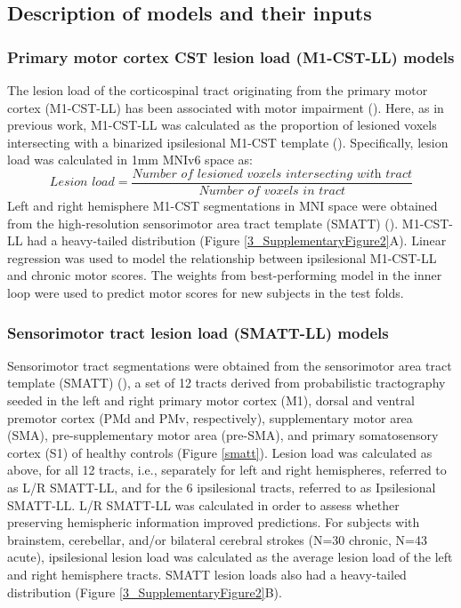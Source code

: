 \documentclass[phd,tocprelim]{cornell}
\begin{document}
\subsection{Description of models and their inputs}
\subsubsection{Primary motor cortex CST lesion load (M1-CST-LL) models}

The lesion load of the corticospinal tract originating from the primary motor cortex (M1-CST-LL) has been associated with motor impairment (\cite{Stinear2017-eg}). Here, as in previous work, M1-CST-LL was calculated as the proportion of lesioned voxels intersecting with a binarized ipsilesional M1-CST template (\cite{Zhu2010-qh}). Specifically, lesion load was calculated in 1mm MNIv6 space as:
\begin{equation}
    \textit{Lesion load} = \frac{\textit{Number of lesioned voxels intersecting with  tract}}{\textit{Number of voxels in tract}}
\end{equation}
Left and right hemisphere M1-CST segmentations in MNI space were obtained from the high-resolution sensorimotor area tract template (SMATT) (\cite{Archer2018-ti}). M1-CST-LL had a heavy-tailed distribution (Figure \ref{3_SupplementaryFigure2}A).
Linear regression was used to model the relationship between ipsilesional M1-CST-LL and chronic motor scores. The weights from best-performing model in the inner loop were used to predict motor scores for new subjects in the test folds. 

\subsubsection{Sensorimotor tract lesion load (SMATT-LL) models}
Sensorimotor tract segmentations were obtained from the sensorimotor area tract template (SMATT) (\cite{Archer2018-ti}), a set of 12 tracts derived from probabilistic tractography seeded in the left and right primary motor cortex (M1), dorsal and ventral premotor cortex (PMd and PMv, respectively), supplementary motor area (SMA), pre-supplementary motor area (pre-SMA), and primary somatosensory cortex (S1) of healthy controls (Figure \ref{smatt}). Lesion load was calculated as above, for all 12 tracts, i.e., separately for left and right hemispheres, referred to as L/R SMATT-LL, and for the 6 ipsilesional tracts, referred to as Ipsilesional SMATT-LL. L/R SMATT-LL was calculated in order to assess whether preserving hemispheric information improved predictions. For subjects with brainstem, cerebellar, and/or bilateral cerebral strokes (N=30 chronic, N=43 acute), ipsilesional lesion load was calculated as the average lesion load of the left and right hemisphere tracts.  SMATT lesion loads also had a heavy-tailed distribution (Figure \ref{3_SupplementaryFigure2}B). 
\end{document}

